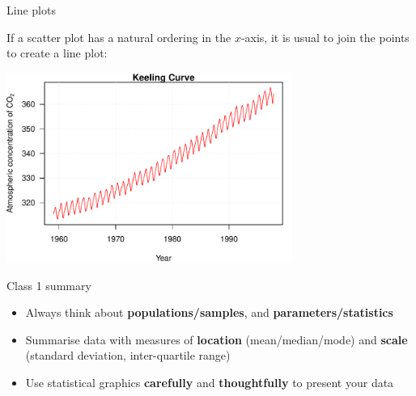 \documentclass[12pt,xcolor=dvipsnames,handout,mathserif,aspectratio=169]{beamer}
\newcommand{\bbl}[1]{{\color{NavyBlue} \textbf{#1}}}
\newcommand{\bgr}[1]{{\color{PineGreen} \textbf{#1}}}
\begin{document}
\begin{frame}{ Line plots  }

If a scatter plot has a natural ordering in the $x$-axis, it is usual to join the points to create a line plot:
\begin{center}
\includegraphics[width=0.7\textwidth]{KeelingCurve.pdf}
\end{center}

\end{frame}

\begin{frame}{ Class 1 summary  }

\begin{itemize}
\item Always think about \bbl{populations/samples}, and \bgr{parameters/statistics}
\item Summarise data with measures of \bbl{location} (mean/median/mode) and \bgr{scale} (standard deviation, inter-quartile range)
\item Use statistical graphics \bbl{carefully} and \bgr{thoughtfully} to present your data
\end{itemize}


\end{frame}
\end{document}
